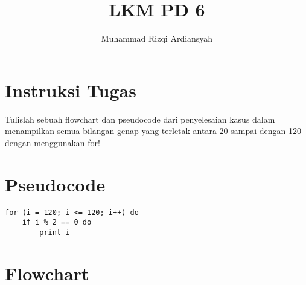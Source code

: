 \documentclass[12pt, letterpaper]{article}
\title{LKM PD 6}
\author{Muhammad Rizqi Ardiansyah}
\begin{document}
	
	\begin{titlepage}
		\maketitle
	\end{titlepage}
	
	\section{Instruksi Tugas}
	Tulislah sebuah flowchart dan pseudocode dari penyelesaian kasus dalam menampilkan semua bilangan genap yang terletak antara 20 sampai dengan 120 dengan menggunakan for!
	\section{Pseudocode}
	\begin{lstlisting}
for (i = 120; i <= 120; i++) do 
	if i % 2 == 0 do 
		print i
	\end{lstlisting}
	\section{Flowchart}
	
\end{document}
